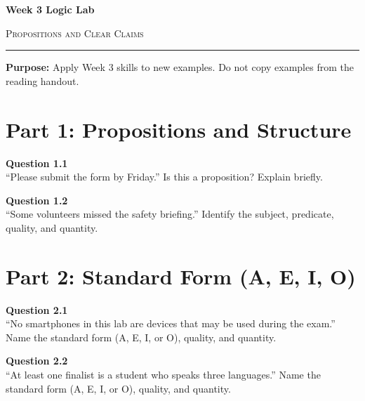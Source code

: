 \documentclass[12pt]{article}
\begin{document}
\begin{center}
{\LARGE\bfseries Week 3 Logic Lab}\par\vspace{0.05em}
{\large\scshape Propositions and Clear Claims}\par\vspace{0.1em}
\rule{0.78\textwidth}{0.5pt}\par\vspace{0.15em}
\end{center}

\noindent\textbf{Purpose:} Apply Week 3 skills to new examples. Do not copy examples from the reading handout.

\vspace{0.3em}

\section*{Part 1: Propositions and Structure}

\textbf{Question 1.1}\\[-0.15em]
``Please submit the form by Friday.'' Is this a proposition? Explain briefly.


\textbf{Question 1.2}\\[-0.15em]
``Some volunteers missed the safety briefing.'' Identify the subject, predicate, quality, and quantity.


\newpage

\section*{Part 2: Standard Form (A, E, I, O)}

\textbf{Question 2.1}\\[-0.15em]
``No smartphones in this lab are devices that may be used during the exam.'' Name the standard form (A, E, I, or O), quality, and quantity.


\textbf{Question 2.2}\\[-0.15em]
``At least one finalist is a student who speaks three languages.'' Name the standard form (A, E, I, or O), quality, and quantity.


\newpage
\end{document}
